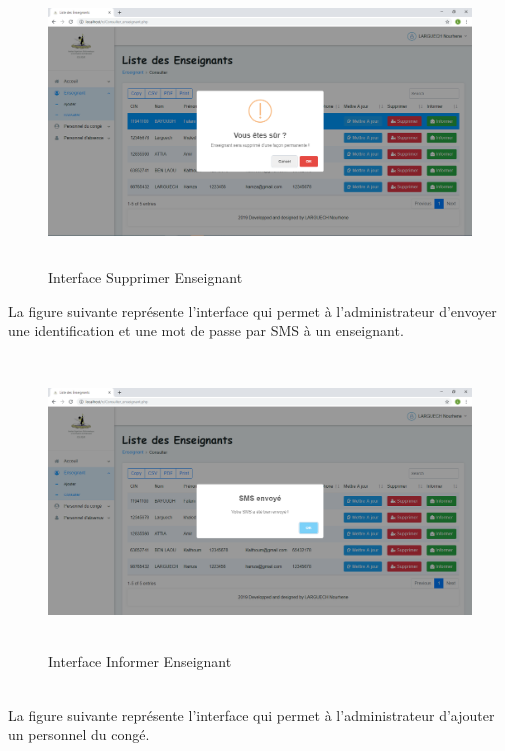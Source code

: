 \documentclass[12 pt ]{report}
\begin{document}
\begin{figure}[h]
 \begin{center}
\includegraphics[width= 18 cm ,height=  7.5cm]{supprimer_enseignant.PNG}
\caption{Interface Supprimer Enseignant}

\end{center}
\end{figure}
\newpage
 La figure suivante représente l'interface qui permet à l'administrateur d'envoyer une identification et une mot de passe par SMS à un enseignant.
\begin{figure}[h]
 \begin{center}
\includegraphics[width= 18 cm ,height=  7.75cm]{informer_enseignant.PNG}
\caption{Interface Informer Enseignant}

\end{center}
\end{figure}\\
La figure suivante représente l'interface qui permet à l'administrateur d'ajouter  un personnel du congé.
\end{document}
